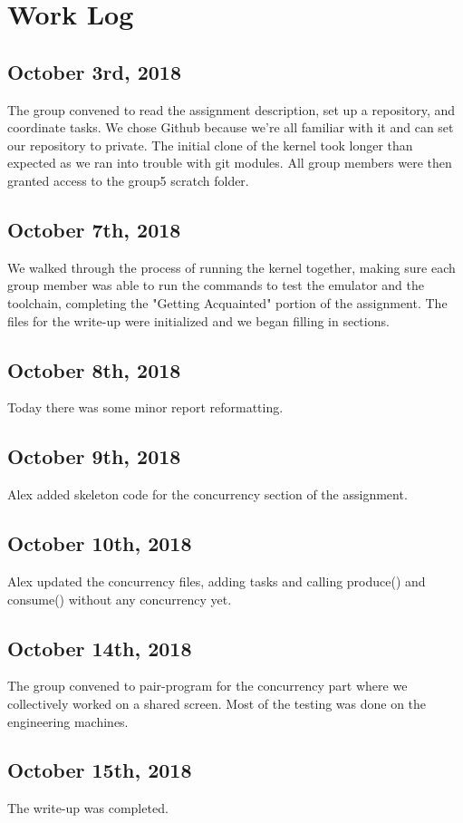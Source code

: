 \documentclass[onecolumn, draftclsnofoot,10pt, compsoc]{IEEEtran}
\begin{document}
\section{Work Log}
\subsection{October 3rd, 2018}
The group convened to read the assignment description, set up a repository, and coordinate tasks. 
We chose Github because we're all familiar with it and can set our repository to private. 
The initial clone of the kernel took longer than expected as we ran into trouble with git modules. 
All group members were then granted access to the group5 scratch folder.

\subsection{October 7th, 2018}
We walked through the process of running the kernel together, making sure each group member was able to run the commands to test the emulator and the toolchain, completing the "Getting Acquainted" portion of the assignment.
The files for the write-up were initialized and we began filling in sections.

\subsection{October 8th, 2018}
Today there was some minor report reformatting.

\subsection{October 9th, 2018}
Alex added skeleton code for the concurrency section of the assignment.

\subsection{October 10th, 2018}
Alex updated the concurrency files, adding tasks and calling produce() and consume() without any concurrency yet.

\subsection{October 14th, 2018}
The group convened to pair-program for the concurrency part where we collectively worked on a shared screen. Most of the testing was done on the engineering machines.

\subsection{October 15th, 2018}
The write-up was completed.%


%  
%  
\end{document}
